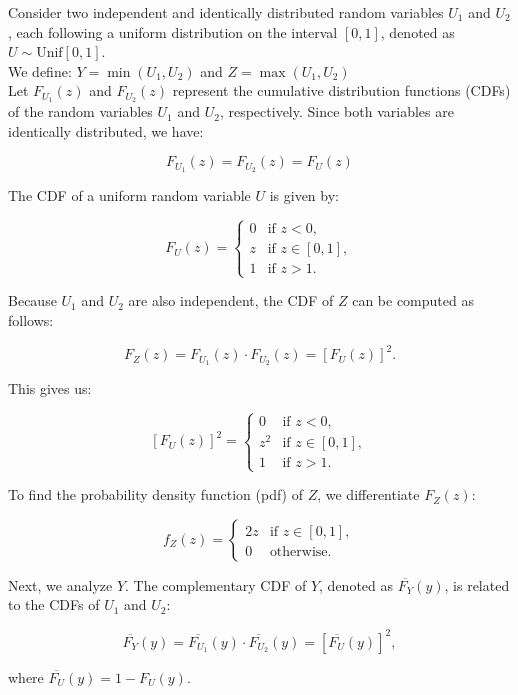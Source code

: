 \begin{example}
Consider two independent and identically distributed random variables \( U_1 \) and \( U_2 \), each following a uniform distribution on the interval \([0, 1]\), denoted as \( U \sim \text{Unif}[0, 1] \).\\

We define: \( Y = \min(U_1, U_2) \) and  \( Z = \max(U_1, U_2) \)\\


Let \( F_{U_1}(z) \) and \( F_{U_2}(z) \) represent the cumulative distribution functions (CDFs) of the random variables \( U_1 \) and \( U_2 \), respectively. Since both variables are identically distributed, we have:

\[
F_{U_1}(z) = F_{U_2}(z) = F_U(z)
\]

The CDF of a uniform random variable \( U \) is given by:

\[
F_U(z) =
\begin{cases}
0 & \text{if } z < 0, \\
z & \text{if } z \in [0, 1], \\
1 & \text{if } z > 1.
\end{cases}
\]

Because \( U_1 \) and \( U_2 \) are also independent, the CDF of \( Z \) can be computed as follows:

\[
F_Z(z) = F_{U_1}(z) \cdot F_{U_2}(z) = [F_U(z)]^2.
\]

This gives us:

\[
[F_U(z)]^2 =
\begin{cases}
0 & \text{if } z < 0, \\
z^2 & \text{if } z \in [0, 1], \\
1 & \text{if } z > 1.
\end{cases}
\]

To find the probability density function (pdf) of \( Z \), we differentiate \( F_Z(z) \):

\[
f_Z(z) =
\begin{cases}
2z & \text{if } z \in [0, 1], \\
0 & \text{otherwise}.
\end{cases}
\]

Next, we analyze \( Y \). The complementary CDF of \( Y \), denoted as \( \overline{F_Y}(y) \), is related to the CDFs of \( U_1 \) and \( U_2 \):

\[
\overline{F_Y}(y) = \overline{F_{U_1}}(y) \cdot \overline{F_{U_2}}(y) = [\overline{F_U}(y)]^2,
\]

where \( \overline{F_U}(y) = 1 - F_U(y) \).\\


\end{example}
